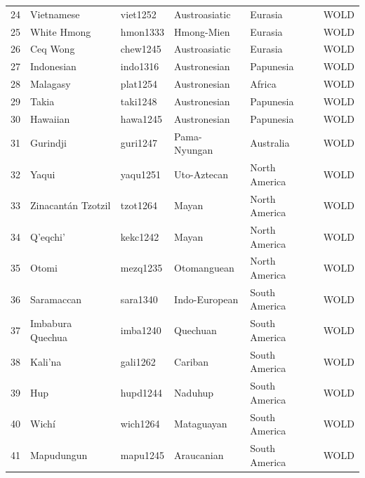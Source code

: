 \begin{table}[ht]
\begin{tabular}{rlllll}
  24 & Vietnamese & viet1252 & Austroasiatic & Eurasia & WOLD \\ 
  25 & White Hmong & hmon1333 & Hmong-Mien & Eurasia & WOLD \\ 
  26 & Ceq Wong & chew1245 & Austroasiatic & Eurasia & WOLD \\ 
  27 & Indonesian & indo1316 & Austronesian & Papunesia & WOLD \\ 
  28 & Malagasy & plat1254 & Austronesian & Africa & WOLD \\ 
  29 & Takia & taki1248 & Austronesian & Papunesia & WOLD \\ 
  30 & Hawaiian & hawa1245 & Austronesian & Papunesia & WOLD \\ 
  31 & Gurindji & guri1247 & Pama-Nyungan & Australia & WOLD \\ 
  32 & Yaqui & yaqu1251 & Uto-Aztecan & North America & WOLD \\ 
  33 & Zinacantán Tzotzil & tzot1264 & Mayan & North America & WOLD \\ 
  34 & Q'eqchi' & kekc1242 & Mayan & North America & WOLD \\ 
  35 & Otomi & mezq1235 & Otomanguean & North America & WOLD \\ 
  36 & Saramaccan & sara1340 & Indo-European & South America & WOLD \\ 
  37 & Imbabura Quechua & imba1240 & Quechuan & South America & WOLD \\ 
  38 & Kali'na & gali1262 & Cariban & South America & WOLD \\ 
  39 & Hup & hupd1244 & Naduhup & South America & WOLD \\ 
  40 & Wichí & wich1264 & Mataguayan & South America & WOLD \\ 
  41 & Mapudungun & mapu1245 & Araucanian & South America & WOLD \\ 
   \hline
\end{tabular}
\end{table}
